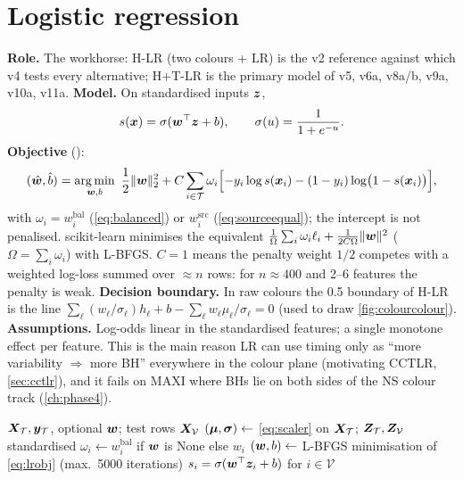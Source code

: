 \section{Logistic regression}\label{sec:lr}
\textbf{Role.} The workhorse: H-LR (two colours + LR) is the v2 reference against which v4 tests every alternative;
H+T-LR is the primary model of v5, v6a, v8a/b, v9a, v10a, v11a. \textbf{Model.} On standardised inputs $\bm{z}$,
\begin{equation}
s(\bm{x}) = \sigma(\bm{w}^\top\bm{z} + b),\qquad \sigma(u)=\frac{1}{1+e^{-u}} .\label{eq:lrmodel}
\end{equation}
\textbf{Objective} ():
\begin{equation}
(\hat{\bm{w}},\hat b) = \operatorname*{arg\,min}_{\bm{w},b}\ \frac12\|\bm{w}\|_2^2 + C\sum_{i\in\mathcal T} \omega_i\Bigl[-y_i\log s(\bm{x}_i)-(1-y_i)\log\bigl(1-s(\bm{x}_i)\bigr)\Bigr],\label{eq:lrobj}
\end{equation}
with $\omega_i = w^{\mathrm{bal}}_i$ (\cref{eq:balanced}) or $w^{\mathrm{src}}_i$ (\cref{eq:sourceequal}); the intercept is
not penalised. scikit-learn minimises the equivalent $\frac{1}{\Omega}\sum_i\omega_i\ell_i + \frac{1}{2C\Omega}\|\bm{w}\|^2$
($\Omega=\sum_i\omega_i$) with L-BFGS. $C=1$ means the penalty weight $1/2$ competes with a weighted log-loss summed over
$\approx n$ rows: for $n\approx400$ and 2--6 features the penalty is weak. \textbf{Decision boundary.} In raw colours the
0.5 boundary of H-LR is the line $\sum_\ell (w_\ell/\sigma_\ell)h_\ell + b - \sum_\ell w_\ell\mu_\ell/\sigma_\ell = 0$
(used to draw \cref{fig:colourcolour}). \textbf{Assumptions.} Log-odds linear in the standardised features; a single
monotone effect per feature. This is the main reason LR can use timing only as ``more variability $\Rightarrow$ more BH''
everywhere in the colour plane (motivating CCTLR, \cref{sec:cctlr}), and it fails on MAXI where BHs lie on both sides of
the NS colour track (\cref{ch:phase4}).

\begin{algorithm}[htbp]
\caption{LR fit and score (one fold)}\label{alg:lr}
\begin{algorithmic}[1]
\Require $\bm{X}_\mathcal{T},\bm{y}_\mathcal{T}$, optional $\bm{w}$; test rows $\bm{X}_\mathcal{V}$
\State $(\bm{\mu},\bm{\sigma})\gets$ \cref{eq:scaler} on $\bm{X}_\mathcal{T}$; $\bm{Z}_\mathcal{T},\bm{Z}_\mathcal{V}$ standardised
\State $\omega_i\gets w^{\mathrm{bal}}_i$ if $\bm{w}$ is None else $w_i$
\State $(\bm{w},b)\gets$ L-BFGS minimisation of \cref{eq:lrobj} (max.\ 5000 iterations)
\State \Return $s_i = \sigma(\bm{w}^\top\bm{z}_i+b)$ for $i\in\mathcal V$
\end{algorithmic}
\end{algorithm}


